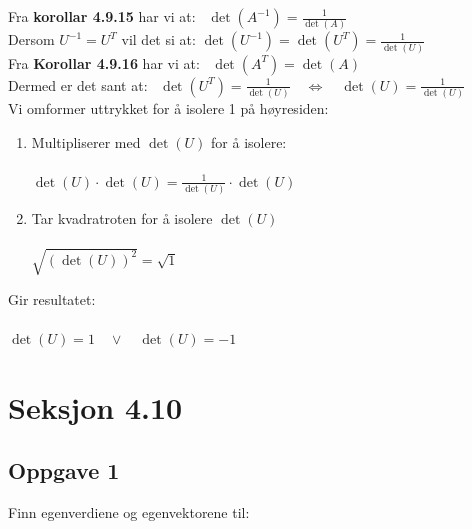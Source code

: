 \documentclass{article}
\newcommand{\uu}[1]{\underline{\underline{#1}}}
\newcommand{\eq}{\quad\Longleftrightarrow\quad}
\begin{document}
Fra \textbf{korollar 4.9.15} har vi at: \qquad \ \(\det(A^{-1}) = \frac{1}{\det(A)}\) \\

Dersom \(U^{-1} = U^T\) vil det si at: \qquad \(\det(U^{-1}) = \det(U^T) = \frac{1}{\det(U)}\)  \\

Fra \textbf{Korollar 4.9.16} har vi at: \qquad \ 
\(\det(A^T) = \det(A)\) \\

Dermed er det sant at: \qquad \qquad \qquad  \ \(\det(U^T) = \frac{1}{\det(U)} \eq \det(U) = \frac{1}{\det(U)}\) \\

Vi omformer uttrykket for å isolere 1 på høyresiden: \\
\begin{enumerate}
    \item Multipliserer med $\det(U)$ for å isolere: \\\\
    \(\det(U) \cdot \det(U) = \frac{1}{\det(U)} \cdot \det(U)\) \\
    \item Tar kvadratroten for å isolere $\det(U)$ \\\\
    \(\sqrt{(\det(U))^2} = \sqrt{1}\)
\end{enumerate}

Gir resultatet:\\\\
\uu{\(\det(U) = 1 \quad \vee \quad \det(U) = -1\)}


\newpage
\section*{Seksjon 4.10}
\subsection*{Oppgave 1}
Finn egenverdiene og egenvektorene til:
\end{document}
